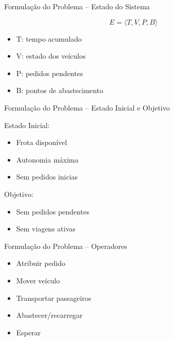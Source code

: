 \documentclass[13pt, handout]{beamer}
\begin{document}
\begin{frame}{Formulação do Problema -- Estado do Sistema}

    \[
        E = \langle T, V, P, B \rangle
    \]

    \begin{itemize}
        \item T: tempo acumulado
        \item V: estado dos veículos
        \item P: pedidos pendentes
        \item B: pontos de abastecimento
    \end{itemize}
    
\end{frame}

\begin{frame}{Formulação do Problema -- Estado Inicial e Objetivo}

    Estado Inicial:
    \begin{itemize}
        \item Frota disponível
        \item Autonomia máxima
        \item Sem pedidos inicias
    \end{itemize}

    \vspace{0.5cm}

    Objetivo:
    \begin{itemize}
        \item Sem pedidos pendentes
        \item Sem viagens ativas
    \end{itemize}
    
    \end{frame}

\begin{frame}{Formulação do Problema -- Operadores}

    \begin{itemize}
        \item Atribuir pedido
        \item Mover veículo
        \item Transportar passageiros
        \item Abastecer/recarregar
        \item Esperar
    \end{itemize}
    
\end{frame}
\end{document}
